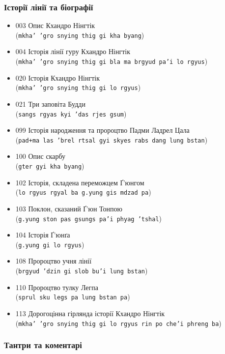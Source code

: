 \documentclass{article}
\begin{document}
\subsubsection{Історії лінії та біографії}

\begingroup\raggedright
\begin{itemize}
\item 003 Опис Кхандро Нінгтік \\ (\texttt{mkha' 'gro snying thig gi kha byang})
\item 004 Історія лінії гуру Кхандро Нінгтік \\ (\texttt{mkha' 'gro snying thig gi bla ma brgyud pa'i lo rgyus})
\item 020 Історія Кхандро Нінгтік \\ (\texttt{mkha' 'gro snying thig gi lo rgyus})
\item 021 Три заповіта Будди \\ (\texttt{sangs rgyas kyi 'das rjes gsum})
\item 099 Історія народження та пророцтво Падми Ладрел Цала \\ (\texttt{pad+ma las 'brel rtsal gyi skyes rabs dang lung bstan})
\item 100 Опис скарбу \\ (\texttt{gter gyi kha byang})
\item 102 Історія, складена переможцем Ґ'юнгом \\ (\texttt{lo rgyus rgyal ba g.yung gis mdzad pa})
\item 103 Поклон, сказаний Ґ'юн Тонпою \\ (\texttt{g.yung ston pas gsungs pa'i phyag 'tshal})
\item 104 Історія Ґ'юнґа \\ (\texttt{g.yung gi lo rgyus})
\item 108 Пророцтво учня лінії \\ (\texttt{brgyud 'dzin gi slob bu'i lung bstan})
\item 110 Пророцтво тулку Легпа \\ (\texttt{sprul sku legs pa lung bstan pa})
\item 113 Дорогоцінна гірлянда історії Кхандро Нінгтік \\ (\texttt{mkha' 'gro snying thig gi lo rgyus rin po che'i phreng ba})
\end{itemize}
\endgroup

\subsubsection{Тантри та коментарі}
\end{document}
